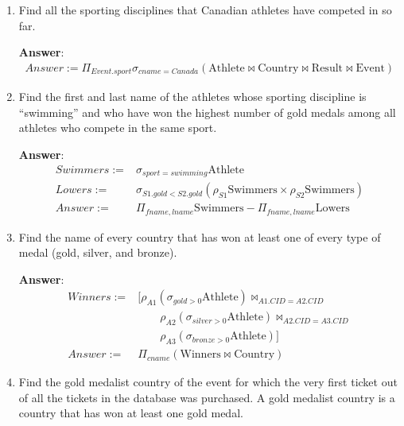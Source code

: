 \documentclass{article}
\begin{document}
\begin{enumerate}
\item   %
Find all the sporting disciplines that Canadian athletes have competed in so far.

{\bf Answer}:\\[5pt]
\begin{equation}
\begin{aligned}
Answer := \Pi_{Event.sport} \sigma_{cname=Canada} (\mathrm{Athlete} \bowtie \mathrm{Country} \bowtie \mathrm{Result} \bowtie \mathrm{Event})
\end{aligned}
\end{equation}

\item   %
Find the first and last name of the athletes whose sporting discipline is ``swimming''
and who have won the highest number of gold medals among all athletes who compete
in the same sport.

{\bf Answer}:\\[5pt]
\begin{equation}
\begin{aligned}
Swimmers := & \sigma_{sport=swimming} \mathrm{Athlete} \\
Lowers := & \sigma_{S1.gold < S2.gold} (\rho_{S1} \mathrm{Swimmers} \times \rho_{S2} \mathrm{Swimmers}) \\
Answer := & \Pi_{fname, lname} \mathrm{Swimmers} - \Pi_{fname, lname} \mathrm{Lowers}
\end{aligned}
\end{equation}

\item   %
Find the name of every country that has won at least one of every type of medal
(gold, silver, and bronze).

{\bf Answer}:\\[5pt]
\begin{equation}
\begin{aligned}
Winners := & [\rho_{A1} (\sigma_{gold>0} \mathrm{Athlete}) \bowtie_{A1.CID=A2.CID} \\
    & \quad \quad \rho_{A2} (\sigma_{silver>0} \mathrm{Athlete}) \bowtie_{A2.CID=A3.CID} \\
    & \quad \quad \rho_{A3} (\sigma_{bronze>0} \mathrm{Athlete})] \\
Answer := & \Pi_{cname} (\mathrm{Winners} \bowtie \mathrm{Country})
\end{aligned}
\end{equation}


\item   %
Find the gold medalist country of the event for which the very first ticket out of
all the tickets in the database was purchased. A gold medalist country is a country
that has won at least one gold medal.


\end{enumerate}
\end{document}
